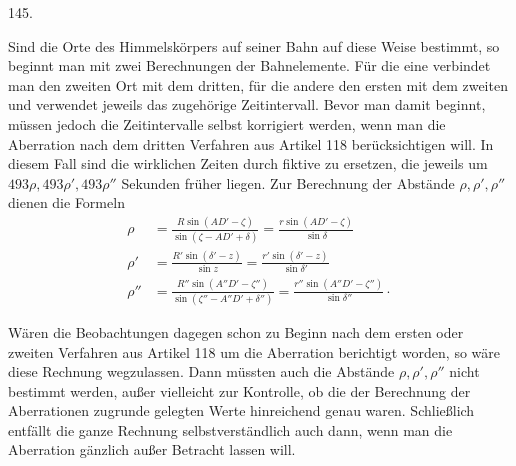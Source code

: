 \par{}\medskip
{}\begin{center}\hypertarget{native-196-article145}{}145.\end{center}
Sind die Orte des Himmelskörpers auf seiner Bahn auf diese Weise bestimmt, so beginnt man mit zwei Berechnungen der Bahnelemente. Für die eine verbindet man den zweiten Ort mit dem dritten, für die andere den ersten mit dem zweiten und verwendet jeweils das zugehörige Zeitintervall. Bevor man damit beginnt, müssen jedoch die Zeitintervalle selbst korrigiert werden, wenn man die Aberration nach dem dritten Verfahren aus Artikel 118 berücksichtigen will. In diesem Fall sind die wirklichen Zeiten durch fiktive zu ersetzen, die jeweils um $493\rho,493\rho',493\rho''$ Sekunden früher liegen. Zur Berechnung der Abstände $\rho,\rho',\rho''$ dienen die Formeln
\[
\begin{aligned}
\rho&=\frac{R\sin(AD'-\zeta)}{\sin(\zeta-AD'+\delta)}=\frac{r\sin(AD'-\zeta)}{\sin\delta}\\[3pt]
\rho'&=\frac{R'\sin(\delta'-z)}{\sin z}=\frac{r'\sin(\delta'-z)}{\sin\delta'}\\[3pt]
\rho''&=\frac{R''\sin(A''D'-\zeta'')}{\sin(\zeta''-A''D'+\delta'')}=\frac{r''\sin(A''D'-\zeta'')}{\sin\delta''}\mathpunct{\cdot}
\end{aligned}
\]

Wären die Beobachtungen dagegen schon zu Beginn nach dem ersten oder zweiten Verfahren aus Artikel 118 um die Aberration berichtigt worden, so wäre diese Rechnung wegzulassen. Dann müssten auch die Abstände $\rho,\rho',\rho''$ nicht bestimmt werden, außer vielleicht zur Kontrolle, ob die der Berechnung der Aberrationen zugrunde gelegten Werte hinreichend genau waren. Schließlich entfällt die ganze Rechnung selbstverständlich auch dann, wenn man die Aberration gänzlich außer Betracht lassen will.
